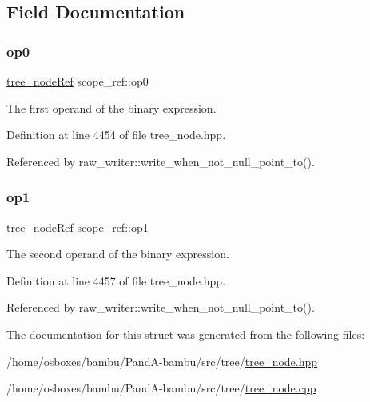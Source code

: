 \subsection{Field Documentation}
\mbox{\label{structscope__ref_a9e3f01d573f4326a7efdec6f3139eed7}} 
\subsubsection{\texorpdfstring{op0}{op0}}
{\footnotesize\ttfamily \hyperlink{tree__node_8hpp_a6ee377554d1c4871ad66a337eaa67fd5}{tree\+\_\+node\+Ref} scope\+\_\+ref\+::op0}



The first operand of the binary expression. 



Definition at line 4454 of file tree\+\_\+node.\+hpp.



Referenced by raw\+\_\+writer\+::write\+\_\+when\+\_\+not\+\_\+null\+\_\+point\+\_\+to().

\mbox{\label{structscope__ref_a054cd6e86555615a6973424a8fb57945}} 
\subsubsection{\texorpdfstring{op1}{op1}}
{\footnotesize\ttfamily \hyperlink{tree__node_8hpp_a6ee377554d1c4871ad66a337eaa67fd5}{tree\+\_\+node\+Ref} scope\+\_\+ref\+::op1}



The second operand of the binary expression. 



Definition at line 4457 of file tree\+\_\+node.\+hpp.



Referenced by raw\+\_\+writer\+::write\+\_\+when\+\_\+not\+\_\+null\+\_\+point\+\_\+to().



The documentation for this struct was generated from the following files\+:\begin{DoxyCompactItemize}
\item 
/home/osboxes/bambu/\+Pand\+A-\/bambu/src/tree/\hyperlink{tree__node_8hpp}{tree\+\_\+node.\+hpp}\item 
/home/osboxes/bambu/\+Pand\+A-\/bambu/src/tree/\hyperlink{tree__node_8cpp}{tree\+\_\+node.\+cpp}\end{DoxyCompactItemize}
